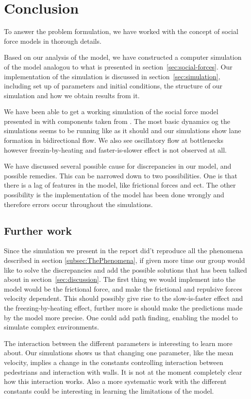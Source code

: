 \section{Conclusion}
\label{sec:conclusion}

To answer the problem formulation, we have worked with the 
concept of social force models in thorough details. 

Based on our analysis of the model, we have constructed a computer simulation of
the model analogou to what is presented in section~\ref{sec:social-forces}.
Our implementation of the simulation is discussed in section~\ref{sec:simulation}, 
including set up of parameters and initial conditions, 
the structure of our simulation and how we obtain results from it.

We have been able to get a working simulation of the social force model 
presented in \cite{self-org} with components taken from \cite{ABconstant}. 
The most basic dynamics og the simulations seems to be running like as it 
should and our simulations show lane formation in bidirectional flow. We also  
see oscillatory flow at bottlenecks however freezin-by-heating 
and faster-is-slower effect is not observed at all.

We have discussed several possible cause for discrepancies in our model, and 
possible remedies. This can be narrowed down to two possibilities. 
One is that there is a lag of features in the model, like frictional forces and ect. 
The other possibility is the implementation of the model 
has been done wrongly and therefore errors occur throughout the simulations. 

\subsection{Further work}
Since the simulation we present in the report did't reproduce all the phenomena described in
section \ref{subsec:ThePhenomena}, if given more time our group would like to solve the discrepancies and add the possible solutions that has been talked about in section~\ref{sec:discussion}. The first thing we would implement into the model would be the frictional force, and make the frictional and repulsive forces velocity dependent. This should possibly give rise to the slow-is-faster effect and the freezing-by-heating effect, further more is should make the predictions made by the model more precise.
One could add path finding, enabling the model to simulate complex environments.

The interaction between the different parameters is interesting to learn more about. Our simulations shows us that changing one parameter, like the mean velocity, implies a change in the constants controlling interaction between pedestrians and interaction with walls. It is not at the moment completely clear how this interaction works. Also a more systematic work with the different constants could be interesting in learning the limitations of the model.  

